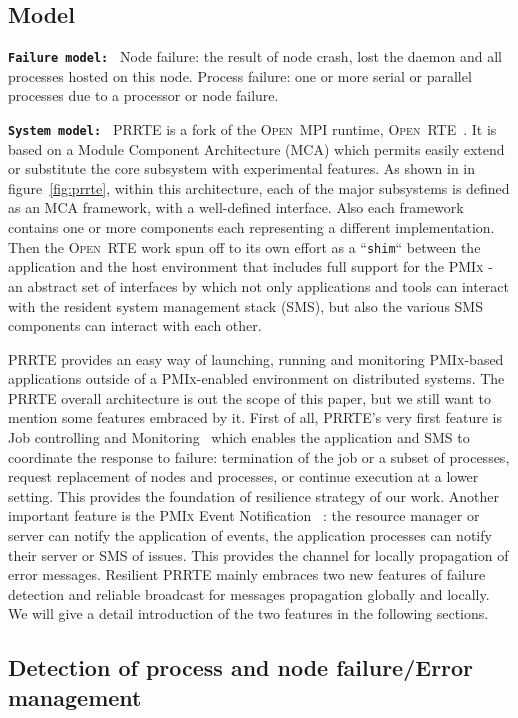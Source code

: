 \documentclass[sigconf]{acmart}
\newcommand{\prrte}[0]{\textsc{PRRTE}\xspace}
\newcommand{\pmix}[0]{\textsc{PMIx}\xspace}
\newcommand{\orte}[0]{\textsc{Open~RTE}\xspace}
\newcommand{\ompi}[0]{\textsc{Open~MPI}\xspace}
\begin{document}
\subsection{Model}
\texttt{\bf Failure model: } Node failure: the result of node crash, lost the daemon and all processes hosted on this node. Process failure: one or more serial or parallel processes due to a processor or node failure.

\texttt{\bf System model: } \prrte is a fork of the \ompi runtime, \orte~\cite{Castain05}. It is based on a Module Component Architecture (MCA) which permits easily extend or substitute the core subsystem with experimental features. As shown in in figure~\ref{fig:prrte}, within this architecture, each of the major subsystems is defined as an MCA framework, with a well-defined interface. Also each framework contains one or more components each representing a different implementation. Then the \orte work spun off to its own effort as a ``\verb|shim|`` between the application and the host environment that includes full support for the \pmix \cite{CASTAIN18} - an abstract set of interfaces by which not only applications and tools can interact with the resident system management stack (SMS), but also the various SMS components can interact with each other. 

\prrte provides an easy way of launching, running and monitoring \pmix-based applications outside of a \pmix-enabled environment on distributed systems. The \prrte overall architecture is out the scope of this paper, but we still want to mention some features embraced by it. First of all, \prrte's very first feature is Job controlling and Monitoring~\cite{Ralph15} which enables the application and SMS to coordinate the response to failure: termination of the job or a subset of processes, request replacement of nodes and processes, or continue execution at a lower setting. This provides the foundation of resilience strategy of our work. Another important feature is the \pmix Event Notification~\cite{Ralph002} : the resource manager or server can notify the application of events, the application processes can notify their server or SMS of issues. This provides the channel for locally propagation of error messages. Resilient \prrte mainly embraces two new features of failure detection and reliable broadcast for messages propagation globally and locally. We will give a detail introduction of the two features in the following sections.

\subsection{Detection of process and node failure/Error management}
\end{document}
